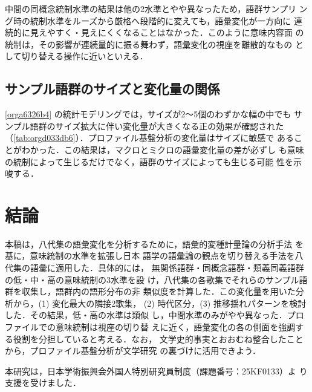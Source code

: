 \documentclass[submit]{ipsj}
\renewcommand{\ref}{\cref}
\begin{document}
中間の同概念統制水準の結果は他の2水準とやや異なったため，語群サンプリ
ング時の統制水準をルーズから厳格へ段階的に変えても，語彙変化が一方向に
連続的に見えやすく・見えにくくなることはなかった．このように意味内容面
の統制は，その影響が連続量的に振る舞わず，語彙変化の視座を離散的なもの
として切り替える操作に近いといえる．
\subsection{サンプル語群のサイズと変化量の関係\label{org2cc83b1}}
\label{sec:orgf8326b3}
\ref{orga6326b4} の統計モデリングでは，サイズが2〜5個のわずかな幅の中でも
サンプル語群のサイズ拡大に伴い変化量が大きくなる正の効果が確認された
（\ref{tab:orgd033db6}）．プロファイル基盤分析の変化量はサイズに敏感で
あることがわかった．この結果は，マクロとミクロの語彙変化量の差が必ずし
も意味の統制によって生じるだけでなく，語群のサイズによっても生じる可能
性を示唆する．
\section{結論\label{org250bf56}}
\label{sec:org48a4ee2}
本稿は，八代集の語彙変化を分析するために，語彙的変種計量論の分析手法
\cite{Speelman2003Profilebased} を基に，意味統制の水準を拡張し日本
語学の語彙論の観点を切り替える手法を八代集の語彙に適用した．具体的には，
無関係語群・同概念語群・類義同義語群の低・中・高の意味統制の3水準を設
け，八代集の各歌集でそれらのサンプル語群を収集し，語群内の語形分布の非
類似度を計算した．この変化量を用いた分析から，(1) 変化最大の隣接2歌集，
(2) 時代区分，(3) 推移揺れパターンを検討した．その結果，低・高の水準は類似
し，中間水準のみがやや異なった．プロファイルでの意味統制は視座の切り替
えに近く，語彙変化の各の側面を強調する役割を分担していると考える．なお，
文学史的事実とおおむね整合したことから，プロファイル基盤分析が文学研究
の裏づけに活用できよう．

\begin{acknowledgment}
  本研究は，日本学術振興会外国人特別研究員制度（課題番号：25KF0133）よ
  り支援を受けました．
\end{acknowledgment}


\end{document}
